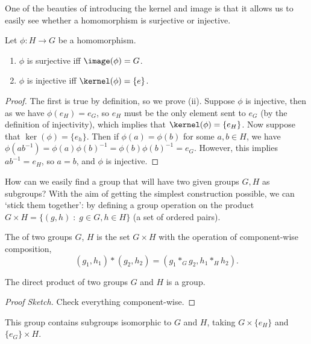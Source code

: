 One of the beauties of introducing the kernel and image is that it allows us to easily see whether a homomorphism is surjective or injective.

\begin{proposition}
	Let $\phi : H \rightarrow G$ be a homomorphism.
	\begin{enumerate}[label=(\roman*)]
		\item $\phi$ is surjective iff $\image(\phi) = G$.
		\item $\phi$ is injective iff $\kernel(\phi) = \{e\}$.
	\end{enumerate}	
\end{proposition}
\begin{proof}
	The first is true by definition, so we prove (ii). Suppose $\phi$ is injective, then as we have $\phi(e_H) = e_G$, so $e_H$ must be the only element sent to $e_G$ (by the definition of injectivity), which implies that $\kernel(\phi) = \{ e_H \}$.
	Now suppose that $\ker(\phi) = \{ e_h \}$. Then if $\phi(a) = \phi(b)$ for some $a, b \in H$, we  have $\phi(ab^{-1}) = \phi(a)\phi(b)^{-1} = \phi(b)\phi(b)^{-1} = e_G$. However, this implies $ab^{-1} = e_H$, so $a = b$, and $\phi$ is injective.
\end{proof}




How can we easily find a group that will have two given groups $G, H$ as subgroups?
With the aim of getting the simplest construction possible, we can `stick them together': by defining a group operation on the product $G \times H = \{ (g, h)  \; : \; g \in G, h \in H\}$ (a set of ordered pairs).

\begin{definition}
	The  of two groups $G$, $H$ is the set $G \times H$ with the operation of component-wise composition,
	$$
	(g_1, h_1) * (g_2, h_2) = (g_1 *_G g_2, h_1 *_H h_2).
	$$
\end{definition}

\begin{proposition}
	The direct product of two groups $G$ and $H$ is a group.
\end{proposition}
\begin{proof}[Proof Sketch]
	Check everything component-wise.
\end{proof}

This group contains subgroups isomorphic to $G$ and $H$, taking $G \times \{ e_H \}$ and $\{ e_G \} \times H$.

